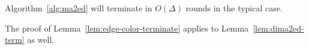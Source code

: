 \begin{lemm} 
\label{lem:dima2ed-term}
Algorithm~\ref{alg:ma2ed} will terminate in $O(\Delta)$ rounds in the typical case.
\end{lemm}

The proof of Lemma~\ref{lem:edge-color-terminate} applies to Lemma~\ref{lem:dima2ed-term} as well.
